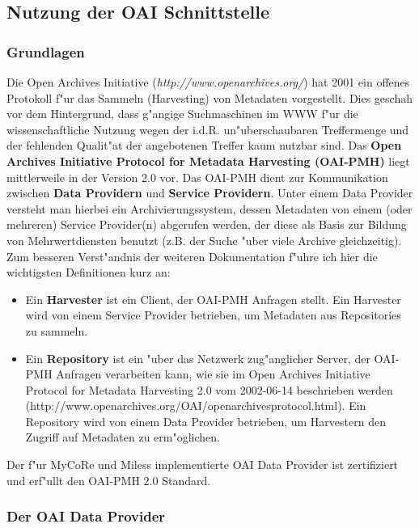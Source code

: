 \subsection{Nutzung der OAI Schnittstelle}

\subsubsection*{Grundlagen}

Die Open Archives Initiative (\textsl{http://www.openarchives.org/}) hat 2001 ein offenes Protokoll f"ur das Sammeln (Harvesting) von Metadaten vorgestellt. Dies geschah vor dem Hintergrund, dass g"angige Suchmaschinen im WWW f"ur
die wissenschaftliche Nutzung wegen der i.d.R. un"uberschaubaren Treffermenge und der fehlenden Qualit"at der angebotenen Treffer kaum nutzbar sind. Das \textbf{Open Archives Initiative Protocol for Metadata Harvesting 
(OAI-PMH)} liegt mittlerweile in der Version 2.0 vor.\linebreak 
Das OAI-PMH dient zur Kommunikation zwischen \textbf{Data Providern} und \textbf{Service Providern}. Unter einem Data Provider versteht man hierbei ein Archivierungssystem, dessen Metadaten von einem (oder mehreren) Service Provider(n) abgerufen werden, der diese als Basis zur Bildung von Mehrwertdiensten benutzt (z.B. der Suche "uber viele Archive gleichzeitig).\linebreak
Zum besseren Verst"andnis der weiteren Dokumentation f"uhre ich hier die wichtigsten Definitionen kurz an:
\begin{itemize}
\item Ein \textbf{Harvester} ist ein Client, der OAI-PMH Anfragen stellt. Ein Harvester wird von einem Service Provider betrieben, um Metadaten aus Repositories zu sammeln.
\item Ein \textbf{Repository} ist ein "uber das Netzwerk zug"anglicher Server, der OAI-PMH Anfragen verarbeiten kann, wie sie im Open Archives Initiative Protocol for Metadata Harvesting 2.0 vom 2002-06-14 beschrieben werden (http://www.openarchives.org/OAI/openarchivesprotocol.html). Ein Repository wird von einem Data Provider betrieben, um Harvestern den Zugriff auf Metadaten zu erm"oglichen.
\end{itemize} 

Der f"ur MyCoRe und Miless implementierte OAI Data Provider ist zertifiziert und erf"ullt den OAI-PMH 2.0 Standard.

\subsubsection*{Der OAI Data Provider}

